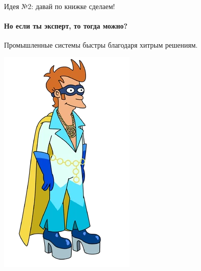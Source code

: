 \begin{frame}[t]{Идея №2: давай по книжке сделаем!}
\framesubtitle{Но если ты эксперт, то тогда можно?}

Промышленные системы быстры благодаря хитрым решениям.

\pause
\includegraphics[width=.3\textwidth]{production/super-duper.png}

\pause


\end{frame}


